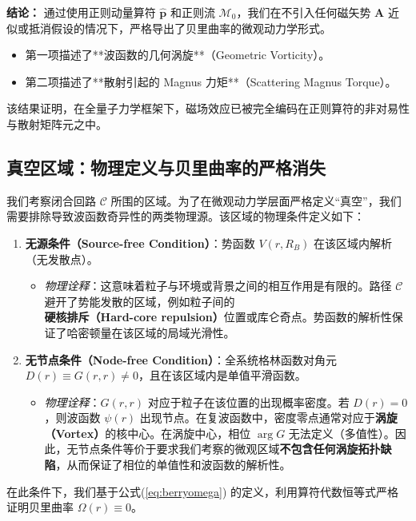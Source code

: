 \documentclass[a4paper,12pt]{article}
\begin{document}
\textbf{结论：}
通过使用正则动量算符 $\hat{\mathbf{p}}$ 和正则流 $\boldsymbol{\mathcal{M}}_0$，我们在不引入任何磁矢势 $\mathbf{A}$ 近似或抵消假设的情况下，严格导出了贝里曲率的微观动力学形式。
\begin{itemize}
    \item 第一项描述了**波函数的几何涡旋**（Geometric Vorticity）。
    \item 第二项描述了**散射引起的 Magnus 力矩**（Scattering Magnus Torque）。
\end{itemize}
该结果证明，在全量子力学框架下，磁场效应已被完全编码在正则算符的非对易性与散射矩阵元之中。

\subsection{真空区域：物理定义与贝里曲率的严格消失}

我们考察闭合回路 $\mathcal{C}$ 所围的区域。为了在微观动力学层面严格定义“真空”，我们需要排除导致波函数奇异性的两类物理源。该区域的物理条件定义如下：

\begin{enumerate}
    \item \textbf{无源条件（Source-free Condition）}：势函数 $V(r, R_B)$ 在该区域内解析（无发散点）。
    \begin{itemize}
        \item \textit{物理诠释}：这意味着粒子与环境或背景之间的相互作用是有限的。路径 $\mathcal{C}$ 避开了势能发散的区域，例如粒子间的\textbf{硬核排斥（Hard-core repulsion）}位置或库仑奇点。势函数的解析性保证了哈密顿量在该区域的局域光滑性。
    \end{itemize}
    
    \item \textbf{无节点条件（Node-free Condition）}：全系统格林函数对角元 $D(r) \equiv G(r,r) \neq 0$，且在该区域内是单值平滑函数。
    \begin{itemize}
        \item \textit{物理诠释}：$G(r,r)$ 对应于粒子在该位置的出现概率密度。若 $D(r)=0$，则波函数 $\psi(r)$ 出现节点。在复波函数中，密度零点通常对应于\textbf{涡旋（Vortex）}的核中心。在涡旋中心，相位 $\arg G$ 无法定义（多值性）。因此，无节点条件等价于要求我们考察的微观区域\textbf{不包含任何涡旋拓扑缺陷}，从而保证了相位的单值性和波函数的解析性。
    \end{itemize}
\end{enumerate}
在此条件下，我们基于公式(\ref{eq:berryomega}) 的定义，利用算符代数恒等式严格证明贝里曲率 $\Omega(r) \equiv 0$。
\end{document}
